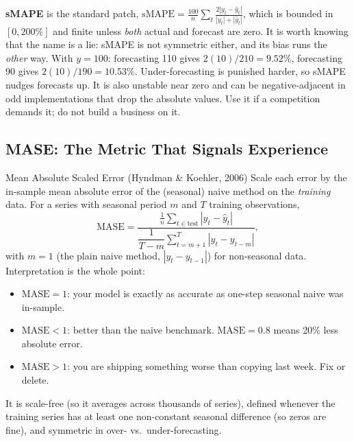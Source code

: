 \textbf{sMAPE} is the standard patch, $\text{sMAPE} = \frac{100}{n}\sum_t \frac{2|y_t - \hat{y}_t|}{|y_t| + |\hat{y}_t|}$, which is bounded in $[0, 200\%]$ and finite unless \emph{both} actual and forecast are zero. It is worth knowing that the name is a lie: sMAPE is not symmetric either, and its bias runs the \emph{other} way. With $y = 100$: forecasting 110 gives $2(10)/210 = 9.52\%$, forecasting 90 gives $2(10)/190 = 10.53\%$. Under-forecasting is punished harder, so sMAPE nudges forecasts up. It is also unstable near zero and can be negative-adjacent in odd implementations that drop the absolute values. Use it if a competition demands it; do not build a business on it.

\subsection{MASE: The Metric That Signals Experience}

\begin{mathresult}{Mean Absolute Scaled Error (Hyndman \& Koehler, 2006)}
Scale each error by the in-sample mean absolute error of the (seasonal) naive method on the \emph{training} data. For a series with seasonal period $m$ and $T$ training observations,
\begin{equation}
\text{MASE} = \frac{\frac{1}{n}\sum_{t \in \text{test}} |y_t - \hat{y}_t|}{\dfrac{1}{T-m}\displaystyle\sum_{t=m+1}^{T} |y_t - y_{t-m}|},
\end{equation}
with $m = 1$ (the plain naive method, $|y_t - y_{t-1}|$) for non-seasonal data. Interpretation is the whole point:
\begin{itemize}
    \item $\text{MASE} = 1$: your model is exactly as accurate as one-step seasonal naive was in-sample.
    \item $\text{MASE} < 1$: better than the naive benchmark. $\text{MASE} = 0.8$ means 20\% less absolute error.
    \item $\text{MASE} > 1$: you are shipping something worse than copying last week. Fix or delete.
\end{itemize}
It is scale-free (so it averages across thousands of series), defined whenever the training series has at least one non-constant seasonal difference (so zeros are fine), and symmetric in over- vs.\ under-forecasting.
\end{mathresult}

